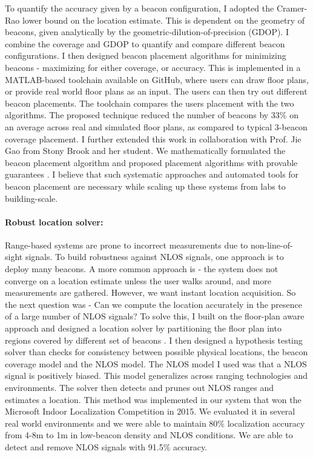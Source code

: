 \documentclass[10pt]{article}
\begin{document}
To quantify the accuracy given by a beacon configuration, I adopted
the Cramer-Rao lower bound on the location estimate.  This is
dependent on the geometry of beacons, given analytically by the
geometric-dilution-of-precision (GDOP).  I combine the coverage and
GDOP to quantify and compare different beacon configurations. I then
designed beacon placement algorithms for minimizing beacons -
maximizing for either coverage, or accuracy. This is implemented in a
MATLAB-based toolchain available on GitHub, where users can draw floor
plans, or provide real world floor plans as an input. The users can
then try out different beacon placements.  The toolchain compares the
users placement with the two algorithms. The proposed technique
reduced the number of beacons by $33\%$ on an average across real and
simulated floor plans, as compared to typical 3-beacon coverage
placement. I further extended this work in collaboration with
Prof. Jie Gao from Stony Brook and her student. We mathematically
formulated the beacon placement algorithm and proposed placement
algorithms with provable guarantees \cite{beaconplacementtheory}. I
believe that such systematic approaches and automated tools for beacon
placement are necessary while scaling up these systems from labs to
building-scale.

\paragraph{Robust location solver:}
Range-based systems are prone to incorrect measurements due to
non-line-of-sight signals. To build robustness against NLOS signals,
one approach is to deploy many beacons. A more common approach is -
the system does not converge on a location estimate unless the user
walks around, and more measurements are gathered. However, we want
instant location acquisition. So the next question was - Can we
compute the location accurately in the presence of a large number of
NLOS signals? To solve this, I built on the floor-plan aware approach
and designed a location solver by partitioning the floor plan into
regions covered by different set of beacons
\cite{rajagopal2018enhancing }. I then designed a hypothesis testing
solver than checks for consistency between possible physical
locations, the beacon coverage model and the NLOS model. The NLOS
model I used was that a NLOS signal is positively biased. This model
generalizes across ranging technologies and environments.  The solver
then detects and prunes out NLOS ranges and estimates a location. This
method was implemented in our system that won the Microsoft Indoor
Localization Competition in 2015. We evaluated it in several real
world environments and we were able to maintain 80\% localization
accuracy from 4-8m to 1m in low-beacon density and NLOS conditions. We
are able to detect and remove NLOS signals with 91.5\% accuracy.
\end{document}
